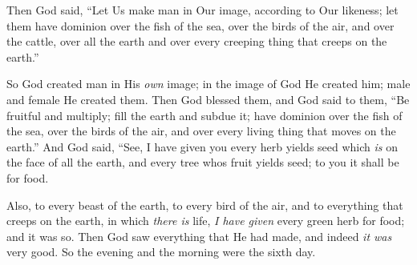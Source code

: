 \bverse Then God said, ``Let Us make man in Our image, according to Our likeness; let them have dominion over the fish of the sea, over the birds of the air, and over the cattle, over all the earth and over every creeping thing that creeps on the earth.''

\bverse So God created man in His \textit{own} image; in the image of God He created him; male and female He created them.
\bverse Then God blessed them, and God said to them, ``Be fruitful and multiply; fill the earth and subdue it; have dominion over the fish of the sea, over the birds of the air, and over every living thing that moves on the earth.''
\bverse And God said, ``See, I have given you every herb \that yields seed which \textit{is} on the face of all the earth, and every tree whos fruit yields seed; to you it shall be for food.

\bverse Also, to every beast of the earth, to every bird of the air, and to everything that creeps on the earth, in which \textit{there is} life, \textit{I have given} every green herb for food; and it was so.
\bverse Then God saw everything that He had made, and indeed \textit{it was} very good. So the evening and the morning were the sixth day.





















